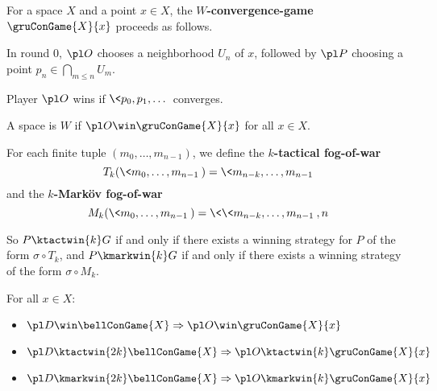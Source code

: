 \begin{defn}
  For a space $X$ and a point $x\in X$, the \textbf{$W$-convergence-game} $\gruConGame{X}{x}$ proceeds as follows.

  In round $0$, $\pl O$ chooses a neighborhood $U_n$ of $x$, followed by $\pl P$ choosing a point $p_n\in \bigcap_{m\leq n}U_m$.

  Player $\pl O$ wins if $\<p_0,p_1,\dots\>$ converges.
\end{defn}

\begin{defn}
  A space is \textbf{$W$} if $\pl O \win \gruConGame{X}{x}$ for all $x\in X$.
\end{defn}

\begin{defn}
  For each finite tuple $(m_0,\dots,m_{n-1})$, we define the \textbf{$k$-tactical fog-of-war}
    \[
      T_k(\<m_0,\dots,m_{n-1}\>)=\<m_{n-k},\dots,m_{n-1}\>
    \]
  and the \textbf{$k$-Mark\"ov fog-of-war}
    \[
      M_k(\<m_0,\dots,m_{n-1}\>)=\<\<m_{n-k},\dots,m_{n-1}\>,n\>
    \]

  So $P\ktactwin{k}G$ if and only if there exists a winning strategy for $P$ of the form $\sigma\circ T_k$, and $P\kmarkwin{k}G$ if and only if there exists a winning strategy of the form $\sigma\circ M_k$.
\end{defn}

\begin{thm}
For all $x\in X$:
  \begin{itemize}
    \item
      $\pl D\win \bellConGame{X} \Rightarrow \pl O \win \gruConGame{X}{x}$
    \item
      $\pl D\ktactwin{2k} \bellConGame{X} \Rightarrow \pl O \ktactwin{k} \gruConGame{X}{x}$
    \item
      $\pl D\kmarkwin{2k} \bellConGame{X} \Rightarrow \pl O \kmarkwin{k} \gruConGame{X}{x}$
  \end{itemize}
\end{thm}

